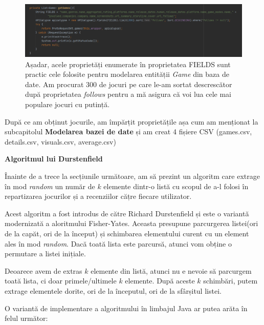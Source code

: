 \documentclass[12pt,a4paper]{report}
\begin{document}
\begin{figure}[H]
\centering
\caption{}
\begin{adjustbox}{max size={\textwidth}{\textheight}}
\includegraphics[scale = 0.6]{exemplu_10_games}
\end{adjustbox}
\caption*{Așadar, acele proprietăți enumerate în proprietatea FIELDS sunt practic cele folosite pentru modelarea entității \emph{Game} din baza de date. Am procurat 300 de jocuri pe care le-am sortat descrescător după proprietatea \emph{follows} pentru a mă asigura că voi lua cele mai populare jocuri cu putință. }
\end{figure}

După ce am obținut jocurile, am împărțit proprietățile așa cum am menționat la subcapitolul \textbf{Modelarea bazei de date} și am creat 4 fișiere CSV (games.csv, details.csv, visuals.csv, average.csv)

\bigskip
\textbf{Algoritmul lui Durstenfield}
\bigskip

Înainte de a trece la secțiunile următoare, am să prezint un algoritm care extrage în mod \emph{random} un număr de \( k\) elemente dintr-o listă cu scopul de a-l folosi în repartizarea jocurilor și a recenziilor cățre fiecare utilizator.

Acest algoritm a fost introdus de către Richard Durstenfield și este o variantă modernizată a aloritmului Fisher-Yates. \cite{16} Aceasta presupune parcurgerea listei(ori de la capăt, ori de la început) și schimbarea elementului curent cu un element ales în mod \emph{random}. Dacă toată lista este parcursă, atunci vom obține o permutare a listei inițiale.

Deoarece avem de extras \( k \) elemente din listă, atunci nu e nevoie să parcurgem toată lista, ci doar primele/ultimele \( k \) elemente. După aceste \( k \) schimbări, putem extrage elementele dorite, ori de la începutul, ori de la sfârșitul listei.

O variantă de implementare a algoritmului în limbajul Java ar putea arăta în felul următor:
\end{document}
